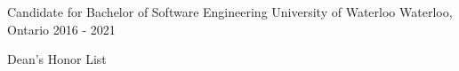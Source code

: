 


\begin{cventries}


\cventry
{Candidate for Bachelor of Software Engineering} %
{University of Waterloo} %
{Waterloo, Ontario} %
{2016 - 2021} %
{ %
\begin{cvitems}
\item {Dean's Honor List}
\end{cvitems}
}


\end{cventries}
